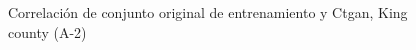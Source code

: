\begin{figure}[H]
    \centering
    
    \caption{Correlación de conjunto original de entrenamiento y Ctgan, King county (A-2)}
    \label{pairwise-king county-a-2-ctgan}
\end{figure}